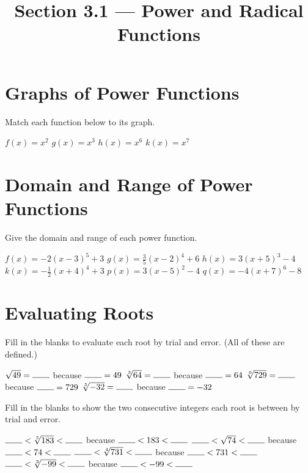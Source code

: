 

\title{Section 3.1 --- Power and Radical Functions}


\maketitle
\section*{Graphs of Power Functions}
Match each function below to its graph.
\begin{Nmenum}
\mitemxxxx
{$f(x)=x^2$}
{$g(x)=x^3$}
{$h(x)=x^6$}
{$k(x)=x^7$}
\end{Nmenum}
\begin{smenum}
\mitemxxxx
{%
}{%
}{%
}{%
}
\end{smenum}

\section*{Domain and Range of Power Functions}
Give the domain and range of each power function.
\begin{smenum}
\mitemxxx
{$f(x)=-2(x-3)^5+3$}
{$g(x)=\frac{3}{5}(x-2)^4+6$}
{$h(x)=3(x+5)^3-4$}
\mitemxxx
{$k(x)=-\frac{1}{2}(x+4)^4+3$}
{$p(x)=3(x-5)^2-4$}
{$q(x)=-4(x+7)^6-8$}
\end{smenum}

\section*{Evaluating Roots}
Fill in the blanks to evaluate each root by trial and error. (All of these are defined.)
\begin{smenum}
\mitemxx
{$\sqrt{49}=\MakeBlank[2em]$ because $\MakeBlank[2em]=49$}
{$\sqrt[3]{64}=\MakeBlank[2em]$ because $\MakeBlank[2em]=64$}
\mitemxx
{$\sqrt[6]{729}=\MakeBlank[2em]$ because $\MakeBlank[2em]=729$}
{$\sqrt[5]{-32}=\MakeBlank[2em]$ because $\MakeBlank[2em]=-32$}
\end{smenum}
Fill in the blanks to show the two consecutive integers each root is between by trial and error.
\begin{smenum}
\mitemx
{$\MakeBlank[2em]<\sqrt[5]{183}<\MakeBlank[2em]$ because $\MakeBlank[2em]<183<\MakeBlank[2em]$}
\mitemx
{$\MakeBlank[2em]<\sqrt{74}<\MakeBlank[2em]$ because $\MakeBlank[2em]<74<\MakeBlank[2em]$}
\mitemx
{$\MakeBlank[2em]<\sqrt[4]{731}<\MakeBlank[2em]$ because $\MakeBlank[2em]<731<\MakeBlank[2em]$}
\mitemx
{$\MakeBlank[2em]<\sqrt[3]{-99}<\MakeBlank[2em]$ because $\MakeBlank[2em]<-99<\MakeBlank[2em]$}
\end{smenum}

